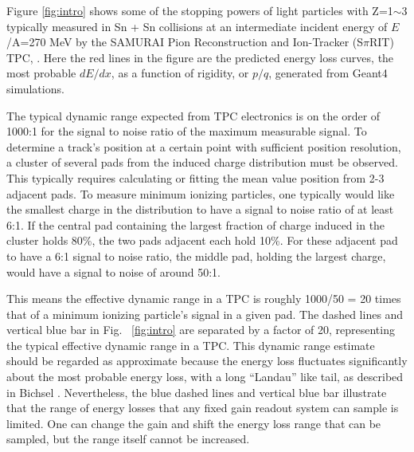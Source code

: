 \documentclass[review]{elsarticle}
\begin{document}
Figure \ref{fig:intro} shows some of the stopping powers of light particles with Z=1$\sim$3 typically measured in Sn + Sn collisions at an intermediate incident energy of $E$/A=270 MeV by the SAMURAI Pion Reconstruction and Ion-Tracker (S$\pi$RIT) TPC, \cite{shane}. Here the red lines in the figure are the predicted energy loss curves, the most probable $dE/dx$, as a function of rigidity, or $p/q$, generated from Geant4 \cite{genfit} simulations. 

The typical dynamic range expected from TPC electronics is on the order of 1000:1 for the signal to noise ratio of the maximum measurable signal. To determine a track's position at a certain point with sufficient position resolution, a cluster of several pads from the induced charge distribution must be observed. This typically requires calculating or fitting the mean value position from 2-3 adjacent pads. To measure minimum ionizing particles, one typically would like the smallest charge in the distribution to have a signal to noise ratio of at least 6:1. If the central pad containing the largest fraction of charge induced in the cluster holds 80\%, the two pads adjacent each hold 10\%. For these adjacent pad to have a 6:1 signal to noise ratio, the middle pad, holding the largest charge, would have a signal to noise of around 50:1. 

 This means the effective dynamic range in a TPC is roughly 1000/50 = 20 times that of a minimum ionizing particle's signal in a given pad. The dashed lines and vertical blue bar in Fig.~ \ref{fig:intro} are separated by a factor of 20, representing the typical effective dynamic range in a TPC. This dynamic range estimate should be regarded as approximate because the energy loss fluctuates significantly about the most probable energy loss, with a long ``Landau'' like tail, as described in Bichsel \cite{bichsel}. Nevertheless, the blue dashed lines and vertical blue bar illustrate that the range of energy losses that any fixed gain readout system can sample is limited. One can change the gain and shift the energy loss range that can be sampled, but the range itself cannot be increased.
\end{document}
